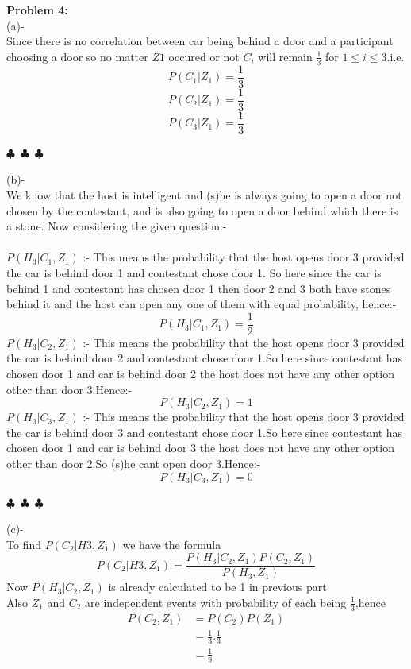 \documentclass[a4paper]{article}
\begin{document}
\textbf{Problem 4:}
\\
(a)-\\
\indent Since there is no correlation between car being behind a door
and a participant choosing a door so no matter $Z1$ occured or not $C_i$ will remain $\frac{1}{3}$ for $1\leq i \leq3$.i.e.\\
$$P(C_1|Z_1)=\frac{1}{3} $$
$$P(C_2|Z_1)=\frac{1}{3} $$
$$P(C_3|Z_1)=\frac{1}{3} $$
\begin{center}
  $\clubsuit$~$\clubsuit$~$\clubsuit$
\end{center}
(b)-\\
\indent We know that the host is intelligent and (s)he is always going to open a door not chosen by the contestant, and is also going to open a door behind which there is a stone. Now considering the given question:-\\\\
$P(H_3|C_1,Z_1)$ :- This means the probability that the host opens door 3 provided the car is behind door 1 and contestant chose door 1. So here since the car is behind 1 and contestant has chosen door 1 then door 2 and 3 both have stones behind it and the host can open any one of them with equal probability, hence:-
$$P(H_3|C_1,Z_1)=\frac{1}{2}$$
$P(H_3|C_2,Z_1)$ :- This means the probability that the host opens door 3 provided the car is behind door 2 and contestant chose door 1.So here since contestant has chosen door 1 and car is behind door 2 the host does not have any other option other than door 3.Hence:-
$$P(H_3|C_2,Z_1)=1$$
$P(H_3|C_3,Z_1)$ :- This means the probability that the host opens door 3 provided the car is behind door 3 and contestant chose door 1.So here since contestant has chosen door 1 and car is behind door 3 the host does not have any other option other than door 2.So (s)he cant open door 3.Hence:-
$$P(H_3|C_3,Z_1)=0$$
\begin{center}
  $\clubsuit$~$\clubsuit$~$\clubsuit$
\end{center}
(c)-\\
\indent To find $P(C_2|H3,Z_1)$ we have the formula
$$P(C_2|H3,Z_1)=\frac{P(H_3|C_2,Z_1)P(C_2,Z_1)}{P(H_3,Z_1)}$$
Now $P(H_3|C_2,Z_1)$ is already calculated to be 1 in previous part\\
Also $Z_1$ and $C_2$ are independent events with probability of each being $\frac{1}{3}$,hence
\begin{equation*}
\begin{split}
P(C_2,Z_1)&=P(C_2)P(Z_1)\\
&=\frac{1}{3}.\frac{1}{3}\\
&=\frac{1}{9}
\end{split}
\end{equation*}
\end{document}
